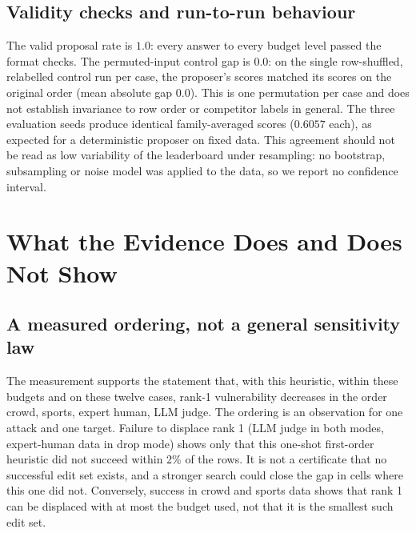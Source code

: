 \documentclass{article}
\begin{document}
\subsection{Validity checks and run-to-run behaviour}
The valid proposal rate is $1.0$: every answer to every budget level passed the format checks. The permuted-input control gap is $0.0$: on the single row-shuffled, relabelled control run per case, the proposer's scores matched its scores on the original order (mean absolute gap $0.0$). This is one permutation per case and does not establish invariance to row order or competitor labels in general. %
The three evaluation seeds produce identical family-averaged scores ($0.6057$ each), as expected for a deterministic proposer on fixed data. %
This agreement should not be read as low variability of the leaderboard under resampling: no bootstrap, subsampling or noise model was applied to the data, so we report no confidence interval.

\section{What the Evidence Does and Does Not Show}
\label{sec:analysis}
\subsection{A measured ordering, not a general sensitivity law}
The measurement supports the statement that, with this heuristic, within these budgets and on these twelve cases, rank-1 vulnerability decreases in the order crowd, sports, expert human, LLM judge. The ordering is an observation for one attack and one target. Failure to displace rank 1 (LLM judge in both modes, expert-human data in drop mode) shows only that this one-shot first-order heuristic did not succeed within 2\% of the rows. It is not a certificate that no successful edit set exists, and a stronger search could close the gap in cells where this one did not. Conversely, success in crowd and sports data shows that rank 1 can be displaced with at most the budget used, not that it is the smallest such edit set.
\end{document}
